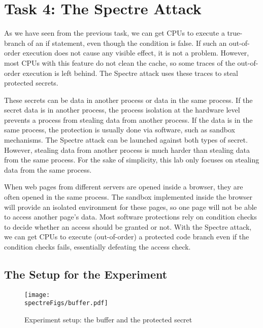 \section{Task 4: The Spectre Attack}


As we have seen from the previous task, we can get CPUs to execute a true-branch of an
if statement, even though the condition is false. If such an out-of-order execution does not
cause any visible effect, it is not a problem. However, most CPUs with this feature do not
clean the cache, so some traces of the out-of-order execution is left behind. The 
Spectre attack uses these traces to steal protected secrets. 


These secrets can be data in another process or data in the same process. 
If the secret data is in another process, the process isolation at the hardware level prevents 
a process from stealing data from another process. If the data is in the same process, 
the protection is usually done via software, such as sandbox mechanisms.  
The Spectre attack can be launched against both types of secret. However, 
stealing data from another process is much harder than stealing data from the same process. For
the sake of simplicity, this lab only focuses on stealing data from the same process. 

When web pages from different servers are opened inside a browser, they are often opened in the
same process. The sandbox implemented inside the browser will provide an isolated environment
for these pages, so one page will not be able to access another page's data. 
Most software protections rely on condition checks to decide whether an access should be
granted or not. With the Spectre attack, we can get CPUs to execute (out-of-order) 
a protected code branch even if the condition checks fails, essentially defeating
the access check.


\subsection{The Setup for the Experiment} 


\begin{figure}[htb]
\centering
\texttt{[image: \\spectreFigs/buffer.pdf]}
\caption{Experiment setup: the buffer and the protected secret}
\label{spectre:fig:buffer}
\end{figure}

